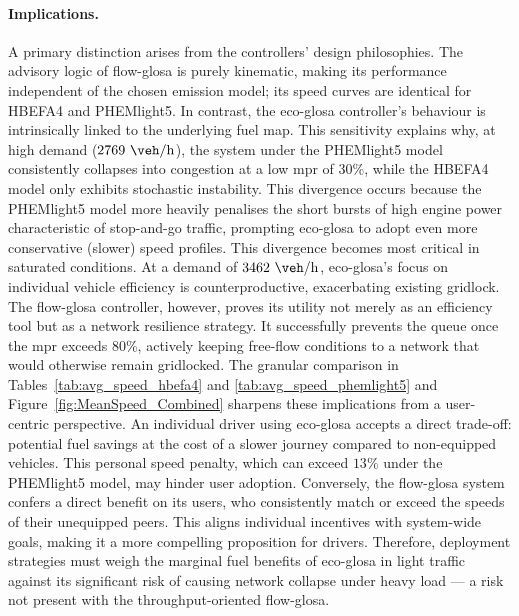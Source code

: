 \paragraph{Implications.}
A primary distinction arises from the controllers' design philosophies. The advisory logic of \ac{flow-glosa} is purely kinematic, making its performance independent of the chosen emission model; its speed curves are identical for HBEFA4 and PHEMlight5. In contrast, the \ac{eco-glosa} controller's behaviour is intrinsically linked to the underlying fuel map. This sensitivity explains why, at high demand ($2769~\unit{\veh\per\hour}$), the system under the PHEMlight5 model consistently collapses into congestion at a low \ac{mpr} of $30\%$, while the HBEFA4 model only exhibits stochastic instability. This divergence occurs because the PHEMlight5 model more heavily penalises the short bursts of high engine power characteristic of stop-and-go traffic, prompting \ac{eco-glosa} to adopt even more conservative (slower) speed profiles.
\mynewline
This divergence becomes most critical in saturated conditions. At a demand of $3462~\unit{\veh\per\hour}$, \ac{eco-glosa}'s focus on individual vehicle efficiency is counterproductive, exacerbating existing gridlock. The \ac{flow-glosa} controller, however, proves its utility not merely as an efficiency tool but as a network resilience strategy. It successfully prevents the queue once the \ac{mpr} exceeds $80\%$, actively keeping free-flow conditions to a network that would otherwise remain gridlocked.
\mynewline
The granular comparison in Tables~\vref{tab:avg_speed_hbefa4} and \vref{tab:avg_speed_phemlight5} and Figure~\vref{fig:MeanSpeed_Combined} sharpens these implications from a user-centric perspective. An individual driver using \ac{eco-glosa} accepts a direct trade-off: potential fuel savings at the cost of a slower journey compared to non-equipped vehicles. This personal speed penalty, which can exceed $13\%$ under the PHEMlight5 model, may hinder user adoption. Conversely, the \ac{flow-glosa} system confers a direct benefit on its users, who consistently match or exceed the speeds of their unequipped peers. This aligns individual incentives with system-wide goals, making it a more compelling proposition for drivers. Therefore, deployment strategies must weigh the marginal fuel benefits of \ac{eco-glosa} in light traffic against its significant risk of causing network collapse under heavy load --- a risk not present with the throughput-oriented \ac{flow-glosa}.

